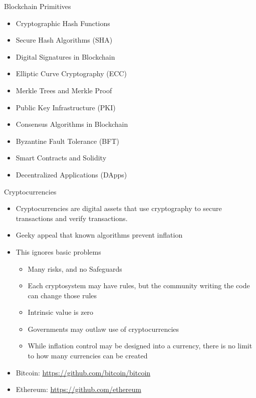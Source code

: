 \begin{withoutheadline}
\begin{frame}{Blockchain Primitives}
    \begin{itemize}
        \item Cryptographic Hash Functions
        \item Secure Hash Algorithms (SHA)
        \item Digital Signatures in Blockchain
        \item Elliptic Curve Cryptography (ECC)
        \item Merkle Trees and Merkle Proof
        \item Public Key Infrastructure (PKI)
        \item Consensus Algorithms in Blockchain
        \item Byzantine Fault Tolerance (BFT)
        \item Smart Contracts and Solidity
        \item Decentralized Applications (DApps)
    \end{itemize}
\end{frame}

\begin{frame}{Cryptocurrencies}
    \begin{itemize}
        \item Cryptocurrencies are digital assets that use cryptography to secure transactions and verify transactions.
        \item Geeky appeal that known algorithms prevent inflation
        \item This ignores basic problems
        \begin{itemize}
            \item Many risks, and no Safeguards
            \item Each cryptosystem may have rules, but the community writing the code can change those rules
            \item Intrinsic value is zero
            \item Governments may outlaw use of cryptocurrencies
            \item While inflation control may be designed into a currency, there is no limit to how many currencies can be created
        \end{itemize}
        \item Bitcoin: \url{https://github.com/bitcoin/bitcoin}
        \item Ethereum: \url{https://github.com/ethereum}
    \end{itemize}
\end{frame}


\end{withoutheadline}
